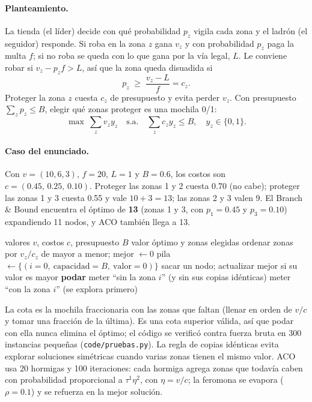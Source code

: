 \paragraph{Planteamiento.} La tienda (el líder) decide con qué probabilidad $p_z$ vigila cada zona y el ladrón (el seguidor) responde. Si roba en la zona $z$ gana $v_z$ y con probabilidad $p_z$ paga la multa $f$; si no roba se queda con lo que gana por la vía legal, $L$. Le conviene robar si $v_z-p_z f>L$, así que la zona queda disuadida si
\[ p_z\;\ge\;\frac{v_z-L}{f}=c_z. \]
Proteger la zona $z$ cuesta $c_z$ de presupuesto y evita perder $v_z$. Con presupuesto $\sum_z p_z\le B$, elegir qué zonas proteger es una mochila 0/1:
\[ \max\ \sum_z v_z y_z \quad\text{s.a.}\quad \sum_z c_z y_z\le B,\quad y_z\in\{0,1\}. \]

\paragraph{Caso del enunciado.} Con $v=(10,6,3)$, $f=20$, $L=1$ y $B=0.6$, los costos son $c=(0.45,\,0.25,\,0.10)$. Proteger las zonas 1 y 2 cuesta 0.70 (no cabe); proteger las zonas 1 y 3 cuesta 0.55 y vale $10+3=13$; las zonas 2 y 3 valen 9. El Branch \& Bound encuentra el óptimo de \textbf{13} (zonas 1 y 3, con $p_1=0.45$ y $p_3=0.10$) expandiendo 11 nodos, y ACO también llega a 13.

\begin{algorithm}[H]
\caption{Branch \& Bound para la mochila de guardias}
\label{p2:alg:bb}
\begin{algorithmic}[1]
\Require valores $v$, costos $c$, presupuesto $B$
\Ensure valor óptimo y zonas elegidas
\State ordenar zonas por $v_z/c_z$ de mayor a menor; mejor $\gets 0$
\State pila $\gets\{(i=0,\ \text{capacidad}=B,\ \text{valor}=0)\}$
  \State sacar un nodo; actualizar mejor si su valor es mayor
   \textbf{podar} \EndIf
  \State meter ``sin la zona $i$'' (y sin sus copias idénticas)
   meter ``con la zona $i$'' (se explora primero) \EndIf
\EndWhile
\end{algorithmic}
\end{algorithm}

La cota es la mochila fraccionaria con las zonas que faltan (llenar en orden de $v/c$ y tomar una fracción de la última). Es una cota superior válida, así que podar con ella nunca elimina el óptimo; el código se verificó contra fuerza bruta en 300 instancias pequeñas (\texttt{code/pruebas.py}). La regla de copias idénticas evita explorar soluciones simétricas cuando varias zonas tienen el mismo valor. ACO usa 20 hormigas y 100 iteraciones: cada hormiga agrega zonas que todavía caben con probabilidad proporcional a $\tau^{1}\eta^{2}$, con $\eta=v/c$; la feromona se evapora ($\rho=0.1$) y se refuerza en la mejor solución.

